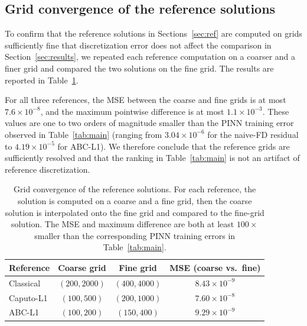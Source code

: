 \documentclass[11pt]{article}
\begin{document}
\subsection{Grid convergence of the reference solutions}
\label{sec:grid_convergence}

To confirm that the reference solutions in Sections~\ref{sec:ref}
are computed on grids sufficiently fine that discretization error does
not affect the comparison in Section~\ref{sec:results}, we repeated
each reference computation on a coarser and a finer grid and compared
the two solutions on the fine grid. The results are reported in
Table~\ref{tab:grid_convergence}.

For all three references, the MSE between the coarse and fine grids
is at most \(7.6\times 10^{-8}\), and the maximum pointwise difference
is at most \(1.1\times 10^{-3}\). These values are one to two orders
of magnitude smaller than the PINN training error observed in
Table~\ref{tab:main} (ranging from \(3.04\times 10^{-6}\) for the
naive-FD residual to \(4.19\times 10^{-5}\) for ABC-L1). We therefore
conclude that the reference grids are sufficiently resolved and that
the ranking in Table~\ref{tab:main} is not an artifact of reference
discretization.

\begin{table}[h]
\centering
\caption{Grid convergence of the reference solutions. For each
         reference, the solution is computed on a coarse and a fine
         grid, then the coarse solution is interpolated onto the fine
         grid and compared to the fine-grid solution. The MSE and
         maximum difference are both at least \(100\times\) smaller
         than the corresponding PINN training errors in
         Table~\ref{tab:main}.}
\label{tab:grid_convergence}
\begin{tabular}{lccc}
\toprule
Reference & Coarse grid & Fine grid & MSE (coarse vs.\ fine) \\
\midrule
Classical & \((200, 2000)\) & \((400, 4000)\) & \(8.43\times 10^{-9}\) \\
Caputo-L1 & \((100, 500)\)  & \((200, 1000)\) & \(7.60\times 10^{-8}\) \\
ABC-L1    & \((100, 200)\)  & \((150, 400)\)  & \(9.29\times 10^{-9}\) \\
\bottomrule
\end{tabular}
\end{table}
\end{document}
